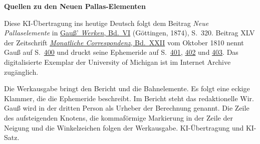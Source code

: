 \clearpage\thispagestyle{empty}
\begin{center}\textbf{Quellen zu den Neuen Pallas-Elementen}\end{center}
\noindent Diese KI-Übertragung ins heutige Deutsch folgt dem Beitrag \textit{Neue Pallaselemente} in \href{https://gdz.sub.uni-goettingen.de/id/PPN236007467}{Gauß’ \textit{Werken}, Bd.~VI} (Göttingen, 1874), S.~320. Beitrag XLV der Zeitschrift \href{https://archive.org/download/bub_gb_YCI4AAAAMAAJ/page/n4.jpg}{\textit{Monatliche Correspondenz}, Bd.~XXII} vom Oktober 1810 nennt Gauß auf S.~\href{https://archive.org/download/bub_gb_YCI4AAAAMAAJ/page/n403.jpg}{400} und druckt seine Ephemeride auf S.~\href{https://archive.org/download/bub_gb_YCI4AAAAMAAJ/page/n404.jpg}{401}, \href{https://archive.org/download/bub_gb_YCI4AAAAMAAJ/page/n405.jpg}{402} und \href{https://archive.org/download/bub_gb_YCI4AAAAMAAJ/page/n406.jpg}{403}. Das digitalisierte Exemplar der University of Michigan ist im Internet Archive zugänglich.
\par\smallskip\noindent Die Werkausgabe bringt den Bericht und die Bahnelemente. Es folgt eine eckige Klammer, die die Ephemeride beschreibt. Im Bericht steht das redaktionelle Wir. Gauß wird in der dritten Person als Urheber der Berechnung genannt. Die Zeile des aufsteigenden Knotens, die kommaförmige Markierung in der Zeile der Neigung und die Winkelzeichen folgen der Werkausgabe. KI-Übertragung und KI-Satz.
\clearpage

